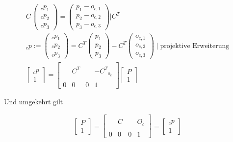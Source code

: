 \begin{gather}
C \,
\begin{pmatrix}
_cp_1\\
_cp_2\\
_cp_3
\end{pmatrix}
=
\begin{pmatrix}
p_1 - o_{c,1}\\
p_2 - o_{c,2}\\
p_3 - o_{c,3}
\end{pmatrix} | C^T\\
_cp := \begin{pmatrix}
_cp_1\\
_cp_2\\
_cp_3
\end{pmatrix}
= C^T 
\begin{pmatrix}
p_1\\
p_2\\
p_3
\end{pmatrix}
-
C^T 
\begin{pmatrix}
o_{c,1}\\
o_{c,2}\\
o_{c,3} 
\end{pmatrix} \mid \text{projektive Erweiterung}\\
\begin{bmatrix}
_cp\\
1
\end{bmatrix}
=
\begin{bmatrix}
& & & \\
& C^T & & -{C^T}_{o_c}\\
& & & \\
0&0 &0 & 1
\end{bmatrix}
\begin{bmatrix}
P\\
1
\end{bmatrix}
\end{gather}
\pagebreak

Und umgekehrt gilt

\begin{gather}
\begin{bmatrix}
P\\
1
\end{bmatrix}
=
\begin{bmatrix}
& & & \\
& C & & O_c\\
& & & \\
0&0 &0 & 1
\end{bmatrix}
=
\begin{bmatrix}
_cp\\
1
\end{bmatrix}
\end{gather}

